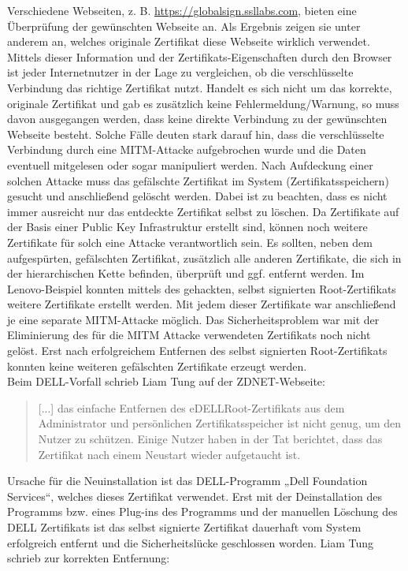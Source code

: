 \noindent
Verschiedene Webseiten, z. B. \url{https://globalsign.ssllabs.com}, bieten eine Überprüfung der gewünschten Webseite an. Als Ergebnis zeigen sie unter anderem an, welches originale Zertifikat diese Webseite wirklich verwendet. Mittels dieser Information und der Zertifikats-Eigenschaften durch den Browser ist jeder Internetnutzer in der Lage zu vergleichen, ob die verschlüsselte Verbindung das richtige Zertifikat nutzt. Handelt es sich nicht um das korrekte, originale Zertifikat und gab es zusätzlich keine Fehlermeldung/Warnung, so muss davon ausgegangen werden, dass keine direkte Verbindung zu der gewünschten Webseite besteht. Solche Fälle deuten stark darauf hin, dass die verschlüsselte Verbindung durch eine MITM-Attacke aufgebrochen wurde und die Daten eventuell mitgelesen oder sogar manipuliert werden. Nach Aufdeckung einer solchen Attacke muss das gefälschte Zertifikat im System (Zertifikatsspeichern) gesucht und anschließend gelöscht werden. Dabei ist zu beachten, dass es nicht immer ausreicht nur das entdeckte Zertifikat selbst zu löschen. Da Zertifikate auf der Basis einer Public Key Infrastruktur \cite[vgl.]{x.509} erstellt sind, können noch weitere Zertifikate für solch eine Attacke verantwortlich sein. Es sollten, neben dem aufgespürten, gefälschten Zertifikat, zusätzlich alle anderen Zertifikate, die sich in der hierarchischen Kette befinden, überprüft und ggf. entfernt werden. Im Lenovo-Beispiel konnten mittels des gehackten, selbst signierten Root-Zertifikats weitere Zertifikate erstellt werden. Mit jedem dieser Zertifikate war anschließend je eine separate MITM-Attacke möglich. Das Sicherheitsproblem war mit der Eliminierung des für die MITM Attacke verwendeten Zertifikats noch nicht gelöst. Erst nach erfolgreichem Entfernen des selbst signierten Root-Zertifikats konnten keine weiteren gefälschten Zertifikate erzeugt werden.\\
Beim DELL-Vorfall schrieb Liam Tung auf der ZDNET-Webseite: 
\begin{quote}
	[...] das einfache Entfernen des eDELLRoot-Zertifikats aus dem Administrator und persönlichen Zertifikatsspeicher ist nicht genug, um den Nutzer zu schützen. Einige Nutzer haben in der Tat berichtet, dass das Zertifikat nach einem Neustart wieder aufgetaucht ist.\cite{zdnet}	
\end{quote}
Ursache für die Neuinstallation ist das DELL-Programm „Dell Foundation Services“, welches dieses Zertifikat verwendet. Erst mit der Deinstallation des Programms bzw. eines Plug-ins des Programms und der manuellen Löschung des DELL Zertifikats ist das selbst signierte Zertifikat dauerhaft vom System erfolgreich entfernt und die Sicherheitslücke geschlossen worden. Liam Tung schrieb zur korrekten Entfernung: 
